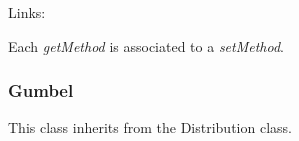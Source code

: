 \begin{description}
\begin{description}
\end{description}
\bigskip

\item[Links:]  \rule{0pt}{1em}
\end{description}


Each  \textit{getMethod}  is associated to a \textit{setMethod}.


\newpage
\subsubsection{Gumbel}

This class inherits from the Distribution class.


